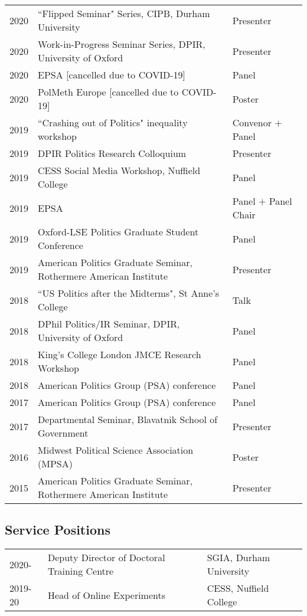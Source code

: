 \documentclass[11pt, a4paper]{article}
\begin{document}
 \begin{tabular}{lll}
   2020 & ``Flipped Seminar" Series, CIPB, Durham University & Presenter \\
   2020 & Work-in-Progress Seminar Series, DPIR, University of Oxford & Presenter \\
   2020 & EPSA [cancelled due to COVID-19] & Panel \\
     2020 & PolMeth Europe [cancelled due to COVID-19] & Poster \\
     2019 & ``Crashing out of Politics" inequality workshop & Convenor $+$ Panel \\
     2019 & DPIR Politics Research Colloquium & Presenter \\
     2019 & CESS Social Media Workshop, Nuffield College & Panel \\
     2019 & EPSA  & Panel $+$ Panel Chair \\
     2019 & Oxford-LSE Politics Graduate Student Conference & Panel \\
     2019 & American Politics Graduate Seminar, Rothermere American Institute & Presenter \\
     2018 & ``US Politics after the Midterms", St Anne's College & Talk \\
     2018 & DPhil Politics/IR Seminar, DPIR, University of Oxford & Panel \\
     2018 & King's College London JMCE Research Workshop & Panel \\
     2018 & American Politics Group (PSA) conference & Panel \\
     2017 & American Politics Group (PSA) conference & Panel \\
     2017 & Departmental Seminar, Blavatnik School of Government & Presenter \\
     2016 & Midwest Political Science Association (MPSA) & Poster \\
     2015 & American Politics Graduate Seminar, Rothermere American Institute & Presenter
 \end{tabular}

 \subsection*{Service Positions}

 \begin{tabular}{lll}
   2020- & Deputy Director of Doctoral Training Centre & SGIA, Durham University \\
   2019-20 & Head of Online Experiments & CESS, Nuffield College \\
   
 \end{tabular}
\end{document}
